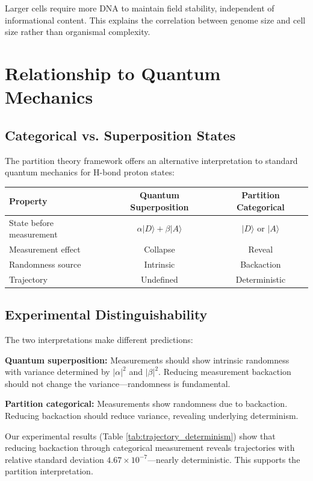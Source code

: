 \documentclass[twocolumn,10pt]{article}
\theoremstyle{remark}
\begin{document}
Larger cells require more DNA to maintain field stability, independent of informational content. This explains the correlation between genome size and cell size rather than organismal complexity.

\section{Relationship to Quantum Mechanics}

\subsection{Categorical vs. Superposition States}

The partition theory framework offers an alternative interpretation to standard quantum mechanics for H-bond proton states:

\begin{center}
\begin{tabular}{lcc}
\toprule
Property & Quantum Superposition & Partition Categorical \\
\midrule
State before measurement & $\alpha|D\rangle + \beta|A\rangle$ & $|D\rangle$ or $|A\rangle$ \\
Measurement effect & Collapse & Reveal \\
Randomness source & Intrinsic & Backaction \\
Trajectory & Undefined & Deterministic \\
\bottomrule
\end{tabular}
\end{center}

\subsection{Experimental Distinguishability}

The two interpretations make different predictions:

\textbf{Quantum superposition:} Measurements should show intrinsic randomness with variance determined by $|\alpha|^2$ and $|\beta|^2$. Reducing measurement backaction should not change the variance---randomness is fundamental.

\textbf{Partition categorical:} Measurements show randomness due to backaction. Reducing backaction should reduce variance, revealing underlying determinism.

Our experimental results (Table \ref{tab:trajectory_determinism}) show that reducing backaction through categorical measurement reveals trajectories with relative standard deviation $4.67 \times 10^{-7}$---nearly deterministic. This supports the partition interpretation.
\end{document}
